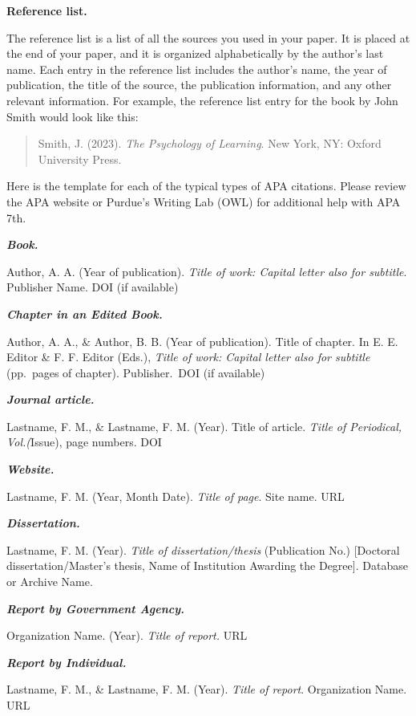 \documentclass[
  b5paper]{book}
\begin{document}
\textbf{Reference list.}

The reference list is a list of all the sources you used in your paper. It is placed at the end of your paper, and it is organized alphabetically by the author's last name. Each entry in the reference list includes the author's name, the year of publication, the title of the source, the publication information, and any other relevant information. For example, the reference list entry for the book by John Smith would look like this:

\begin{quote}
Smith, J. (2023). \emph{The Psychology of Learning}. New York, NY: Oxford University Press.
\end{quote}

Here is the template for each of the typical types of APA citations. Please review the APA website or Purdue's Writing Lab (OWL) for additional help with APA 7th.

\textbf{\emph{Book.}}

Author, A. A. (Year of publication). \emph{Title of work: Capital letter also for subtitle}. Publisher Name. DOI (if available)

\textbf{\emph{Chapter in an Edited Book.}}

Author, A. A., \& Author, B. B. (Year of publication). Title of chapter. In E. E. Editor \& F. F. Editor (Eds.), \emph{Title of work: Capital letter also for subtitle} (pp.~pages of chapter). Publisher.~DOI (if available)

\textbf{\emph{Journal article.}}

Lastname, F. M., \& Lastname, F. M. (Year). Title of article. \emph{Title of Periodical, Vol.(}Issue), page numbers. DOI

\textbf{\emph{Website.}}

Lastname, F. M. (Year, Month Date). \emph{Title of page}. Site name. URL

\textbf{\emph{Dissertation.}}

Lastname, F. M. (Year). \emph{Title of dissertation/thesis} (Publication No.) {[}Doctoral dissertation/Master's thesis, Name of Institution Awarding the Degree{]}. Database or Archive Name.

\textbf{\emph{Report by Government Agency.}}

Organization Name. (Year). \emph{Title of report.} URL

\textbf{\emph{Report by Individual.}}

Lastname, F. M., \& Lastname, F. M. (Year). \emph{Title of report}. Organization Name. URL
\end{document}
